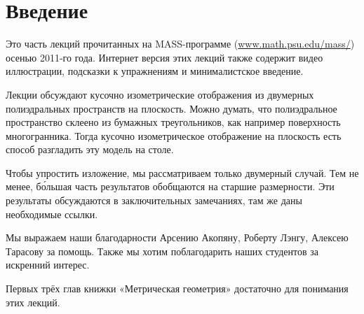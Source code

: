 \tableofcontents
\newpage
\section*{Введение}

Это часть лекций прочитанных 
на MASS-программе (\url{www.math.psu.edu/mass/}) осенью 2011-го года.
Интернет версия этих лекций \cite{petrunin-yashinsky-arXiv} также содержит видео иллюстрации,
подсказки к упражнениям и минималистское введение.

Лекции обсуждают кусочно изометрические отображения из двумерных полиэдральных пространств на плоскость.
Можно думать, что полиэдральное пространство склеено из бумажных треугольников, 
как например поверхность многогранника.  
Тогда кусочно изометрическое отображение на плоскость
есть способ разгладить эту модель на столе. 

Чтобы упростить изложение, 
мы рассматриваем только двумерный случай.
Тем не менее, б\'{о}льшая часть результатов обобщаются на старшие размерности.
Эти результаты обсуждаются в заключительных замечаниях,
там же даны необходимые ссылки.


Мы выражаем наши благодарности 
Арсению Акопяну,
Роберту Лэнгу,
Алексею Тарасову
за помощь.
Также мы хотим поблагодарить наших студентов за искренний интерес.

Первых трёх глав книжки «Метрическая геометрия» \cite{BBI}
достаточно для понимания этих лекций.

